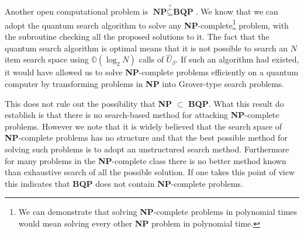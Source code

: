 Another open computational problem is $\textbf{NP} \stackrel{?}{\subseteq} \textbf{BQP}$.
We know that we can adopt the quantum search algorithm to solve any \textbf{NP}-complete\footnote{We can demonstrate that solving \textbf{NP}-complete problems in polynomial times would mean solving every other \textbf{NP} problem in polynomial time.} problem, with the subroutine checking all the proposed solutions to it.
The fact that the quantum search algorithm is optimal means that it is not possible to search an $N$ item search space using $\mathbb{O}(\log_2{N})$ calls of $\hat{U}_\beta$. If such an algorithm had existed, it would have allowed us to solve \textbf{NP}-complete problems efficiently on a quantum computer by transforming problems in \textbf{NP} into Grover-type search problems.

This does not rule out the possibility that \textbf{NP} $\subset$ \textbf{BQP}. What this result do establish is that there is no search-based method for attacking \textbf{NP}-complete problems.
However we note that it is widely believed that the search space of \textbf{NP}-complete problems has no structure and that the best possible method for solving such problems is to adopt an unstructured search method. Furthermore for many problems in the \textbf{NP}-complete class there is no better method known than exhaustive search of all the possible solution. If one takes this point of view this indicates that \textbf{BQP} does not contain \textbf{NP}-complete problems.